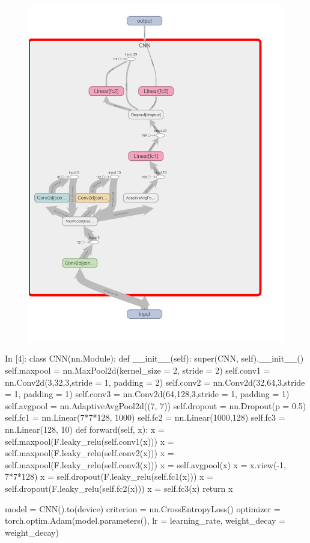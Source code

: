 \documentclass[12pt, a4paper]{article}
\begin{document}
\begin{figure}[h] %
    \centering
    \includegraphics[scale = 0.2]{Img/Dishes/P1.png}
\end{figure}

\begin{python}
In [4]: class CNN(nn.Module):
          def __init__(self):
            super(CNN, self).__init__()
            self.maxpool = nn.MaxPool2d(kernel_size = 2, stride = 2)
            self.conv1 = nn.Conv2d(3,32,3,stride = 1, padding = 2)
            self.conv2 = nn.Conv2d(32,64,3,stride = 1, padding = 1)
            self.conv3 = nn.Conv2d(64,128,3,stride = 1, padding = 1)
            self.avgpool = nn.AdaptiveAvgPool2d((7, 7))
            self.dropout = nn.Dropout(p = 0.5)
            self.fc1 = nn.Linear(7*7*128, 1000)
            self.fc2 = nn.Linear(1000,128)
            self.fc3 = nn.Linear(128, 10)
          def forward(self, x):
            x = self.maxpool(F.leaky_relu(self.conv1(x)))
            x = self.maxpool(F.leaky_relu(self.conv2(x)))
            x = self.maxpool(F.leaky_relu(self.conv3(x)))
            x = self.avgpool(x)
            x = x.view(-1, 7*7*128)
            x = self.dropout(F.leaky_relu(self.fc1(x)))
            x = self.dropout(F.leaky_relu(self.fc2(x)))
            x = self.fc3(x)
            return x
        
        model = CNN().to(device)
        criterion = nn.CrossEntropyLoss()
        optimizer = torch.optim.Adam(model.parameters(), lr = learning_rate, weight_decay = weight_decay)
\end{python}
\end{document}
